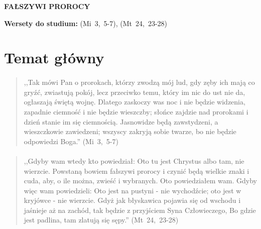 \documentclass[10pt,a4paper,oneside]{article}
\begin{document}
\centerline{\textbf{\MakeUppercase{Fałszywi prorocy}}}
\begin{center}
\textbf{Wersety do studium:} 
\mbox{(Mi 3, 5-7)}, \mbox{(Mt 24, 23-28)}
\end{center}
\section{Temat główny}
\paragraph{}
\begin{quote}
,,Tak mówi Pan o prorokach, którzy zwodzą mój lud, gdy zęby ich mają co gryźć, zwiastują pokój, lecz przeciwko temu, który im nic do ust nie da, ogłaszają świętą wojnę. Dlatego zaskoczy was noc i nie będzie widzenia, zapadnie ciemność i nie będzie wieszczby; słońce zajdzie nad prorokami i dzień stanie im się ciemnością. Jasnowidze będą zawstydzeni, a wieszczkowie zawiedzeni; wszyscy zakryją sobie twarze, bo nie będzie odpowiedzi Boga.'' \mbox{(Mi 3, 5-7)}
\end{quote}
\paragraph{}
\begin{quote}
,,Gdyby wam wtedy kto powiedział: Oto tu jest Chrystus albo tam, nie wierzcie. Powstaną bowiem fałszywi prorocy i czynić będą wielkie znaki i cuda, aby, o ile można, zwieść i wybranych. Oto powiedziałem wam. Gdyby więc wam powiedzieli: Oto jest na pustyni - nie wychodźcie; oto jest w kryjówce - nie wierzcie. Gdyż jak błyskawica pojawia się od wschodu i jaśnieje aż na zachód, tak będzie z przyjściem Syna Człowieczego, Bo gdzie jest padlina, tam zlatują się sępy.'' \mbox{(Mt 24, 23-28)}
\end{quote}
\end{document}
